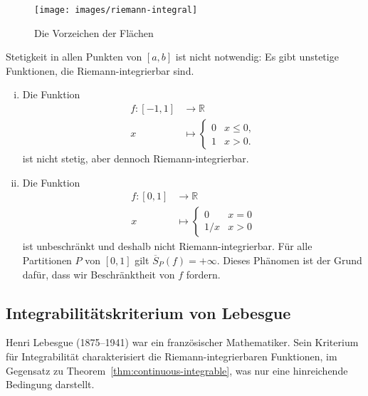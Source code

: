 \documentclass[../main.tex]{subfiles}
\begin{document}
\begin{figure}[htb]
  \centering
  \texttt{[image: images/riemann-integral]}
  \caption{Die Vorzeichen der Flächen}%
  \label{fig:riemann-integral}
\end{figure}

\begin{remark}
  Stetigkeit in allen Punkten von $[a, b]$ ist
  nicht notwendig: Es gibt unstetige Funktionen,
  die Riemann-integrierbar sind.
\end{remark}

\begin{examples}
  \leavevmode
  \begin{enumerate}[(i)]
    \item Die Funktion
      \begin{align*}
        f \colon [-1, 1] & \to \mathbb{R} \\
        x & \mapsto
        \begin{cases}
          0 & x \leq 0,\\
          1 & x > 0.
        \end{cases}
      \end{align*}
      ist nicht stetig, aber dennoch Riemann-integrierbar.
    \item Die Funktion
      \begin{align*}
        f \colon [0, 1] & \to \mathbb{R} \\
        x & \mapsto
        \begin{cases}
          0 & x = 0 \\
          1/x & x > 0
        \end{cases}
      \end{align*}
      ist unbeschränkt und deshalb nicht Riemann-integrierbar.
      Für alle Partitionen $P$ von $[0, 1]$ gilt
      $
      \overline S_P(f) = + \infty$.
      Dieses Phänomen ist der Grund dafür, dass
      wir Beschränktheit von $f$ fordern.
  \end{enumerate}
\end{examples}

\subsection*{Integrabilitätskriterium von Lebesgue}
Henri Lebesgue (1875--1941) war ein französischer Mathematiker.
Sein Kriterium für Integrabilität charakterisiert die
Riemann-integrierbaren Funktionen, im Gegensatz zu
Theorem~\ref{thm:continuous-integrable}, was nur eine
hinreichende Bedingung darstellt.
\end{document}
